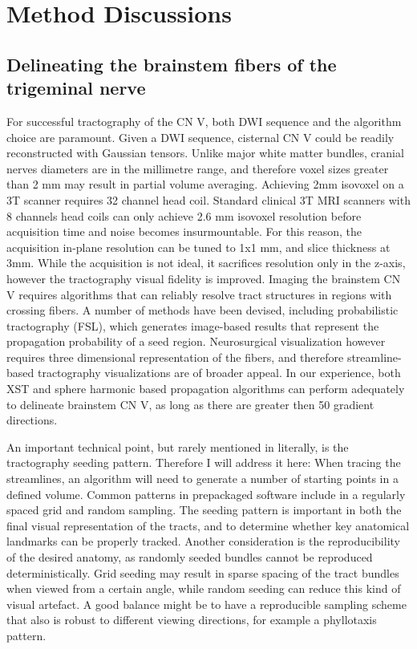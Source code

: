 \section{Method Discussions}

\subsection{Delineating the brainstem fibers of the trigeminal nerve}

For successful tractography of the CN V, both DWI sequence and the algorithm choice are paramount. Given a DWI sequence, cisternal CN V could be readily reconstructed with Gaussian tensors. Unlike major white matter bundles, cranial nerves diameters are in the millimetre range, and therefore voxel sizes greater than 2 mm may result in partial volume averaging. Achieving 2mm isovoxel on a 3T scanner requires 32 channel head coil. Standard clinical 3T MRI scanners with 8 channels head coils can only achieve 2.6 mm isovoxel resolution before acquisition time and noise becomes insurmountable. For this reason, the acquisition in-plane resolution can be tuned to 1x1 mm, and slice thickness at 3mm. While the acquisition is not ideal, it sacrifices resolution only in the z-axis, however the tractography visual fidelity is improved. 
Imaging the brainstem CN V requires algorithms that can reliably resolve tract structures in regions with crossing fibers. A number of methods have been devised, including probabilistic tractography (FSL)\cite{Behrens2007}, which generates image-based results that represent the propagation probability of a seed region. Neurosurgical visualization however requires three dimensional representation of the fibers, and therefore streamline-based tractography visualizations are of broader appeal. In our experience, both XST and sphere harmonic based propagation algorithms can perform adequately to delineate brainstem CN V, as long as there are greater then 50 gradient directions. 

An important technical point, but rarely mentioned in literally, is the tractography seeding pattern. Therefore I will address it here: When tracing the streamlines, an algorithm will need to generate a number of starting points in a defined volume. Common patterns in prepackaged software include in a regularly spaced grid and random sampling. The seeding pattern is important in both the final visual representation of the tracts, and to determine whether key anatomical landmarks can be properly tracked. Another consideration is the reproducibility of the desired anatomy, as randomly seeded bundles cannot be reproduced deterministically. Grid seeding may result in sparse spacing of the tract bundles when viewed from a certain angle, while random seeding can reduce this kind of visual artefact. A good balance might be to have a reproducible sampling scheme that also is robust to different viewing directions, for example a phyllotaxis pattern.

